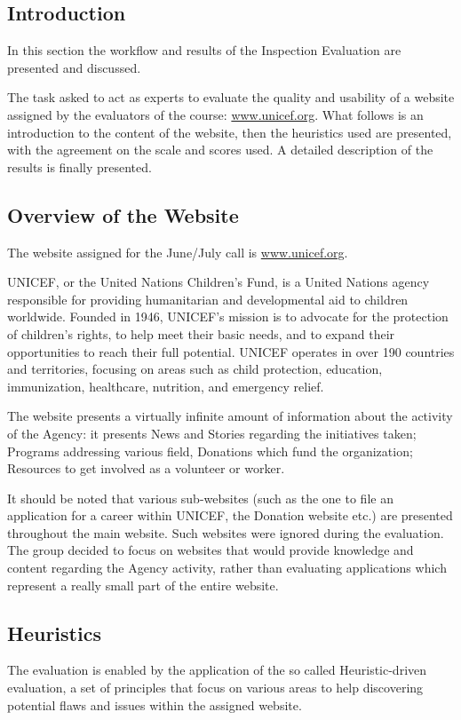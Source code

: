 \subsection{Introduction}
In this section the workflow and results of the Inspection Evaluation are presented and discussed.

The task asked to act as experts to evaluate the quality and usability of a website assigned by the evaluators of the course: \url{www.unicef.org}. What follows is an introduction to the content of the website, then the heuristics used are presented, with the agreement on the scale and scores used. A detailed description of the results is finally presented.



\subsection{Overview of the Website}
The website assigned for the June/July call is \url{www.unicef.org}.

UNICEF, or the United Nations Children’s Fund, is a United Nations agency responsible for providing humanitarian and developmental aid to children worldwide. Founded in 1946, UNICEF’s mission is to advocate for the protection of children’s rights, to help meet their basic needs, and to expand their opportunities to reach their full potential. UNICEF operates in over 190 countries and territories, focusing on areas such as child protection, education, immunization, healthcare, nutrition, and emergency relief.

The website presents a virtually infinite amount of information about the activity of the Agency: it presents News and Stories regarding the initiatives taken; Programs addressing various field, Donations which fund the organization; Resources to get involved as a volunteer or worker.

It should be noted that various sub-websites (such as the one to file an application for a career within UNICEF, the Donation website etc.) are presented throughout the main website. Such websites were ignored during the evaluation. The group decided to focus on websites that would provide knowledge and content regarding the Agency activity, rather than evaluating applications which represent a really small part of the entire website.

\subsection{Heuristics}
The evaluation is enabled by the application of the so called Heuristic-driven evaluation, a set of principles that focus on various areas to help discovering potential flaws and issues within the assigned website.


